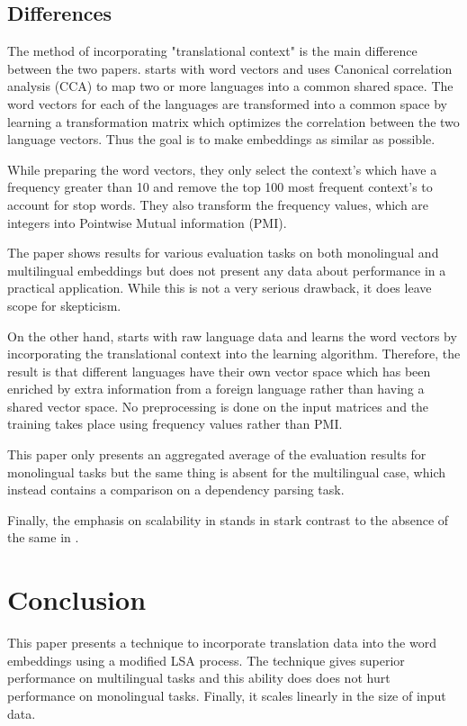 \documentclass[11pt]{article}
\begin{document}
\subsection{Differences}
The method of incorporating "translational context" is the main difference between the two papers. \cite{faruqui2014improving} starts with word vectors and uses Canonical correlation analysis (CCA) to map two or more languages into a common shared space. The word vectors for each of the languages are transformed into a common space by learning a transformation matrix which optimizes the correlation between the two language vectors. Thus the goal is to make embeddings as similar as possible.

While preparing the word vectors, they only select the context's which have a frequency greater than 10 and remove the top 100 most frequent context's to account for stop words. They also transform the frequency values, which are integers into Pointwise Mutual information (PMI).

The paper shows results for various evaluation tasks on both monolingual and multilingual embeddings but does not present any data about performance in a practical application. While this is not a very serious drawback, it does leave scope for skepticism.

On the other hand, \cite{huang2015translation} starts with raw language data and learns the word vectors by incorporating the translational context into the learning algorithm. Therefore, the result is that different languages have their own vector space which has been enriched by extra information from a foreign language rather than having a shared vector space. No preprocessing is done on the input matrices and the training takes place using frequency values rather than PMI.

This paper only presents an aggregated average of the evaluation results for monolingual tasks but the same thing is absent for the multilingual case, which instead contains a comparison on a dependency parsing task.

Finally, the emphasis on scalability in \cite{huang2015translation} stands in stark contrast to the absence of the same in \cite{faruqui2014improving}.


\section{Conclusion}
This paper presents a technique to incorporate translation data into the word embeddings using a modified LSA process. The technique gives superior performance on multilingual tasks and this ability does does not hurt performance on monolingual tasks. Finally, it scales linearly in the size of input data.




\end{document}
